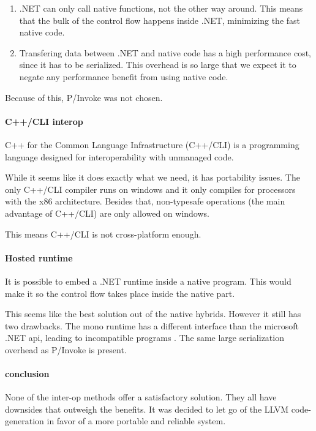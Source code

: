 \begin{enumerate}
    \item .NET can only call native functions, not the other way around.
        This means that the bulk of the control flow happens inside .NET, minimizing the fast native code.
    \item Transfering data between .NET and native code has a high performance cost\cite{msdn_interop_performance}, since it has to be serialized.
        This overhead is so large that we expect it to negate any performance benefit from using native code.
\end{enumerate}

Because of this, P/Invoke was not chosen.

\paragraph{C++/CLI interop}
C++ for the Common Language Infrastructure (C++/CLI) is a programming language designed for interoperability with unmanaged code.\cite{msdn_c++cli}

While it seems like it does exactly what we need, it has portability issues.
The only C++/CLI compiler runs on windows and it only compiles for processors with the x86 architecture\cite{mono_c++cli}.
Besides that, non-typesafe operations (the main advantage of C++/CLI) are only allowed on windows.\cite{mono_c++cli}

This means C++/CLI is not cross-platform enough.

\paragraph{Hosted runtime}
It is possible to embed a .NET runtime inside a native program.
This would make it so the control flow takes place inside the native part.

This seems like the best solution out of the native hybrids.
However it still has two drawbacks.
The mono runtime has a different interface than the microsoft .NET api, leading to incompatible programs \cite{mono_embedding}.
The same large serialization overhead as P/Invoke is present\cite{msdn_hosted}.

\paragraph{conclusion}
None of the inter-op methods offer a satisfactory solution.
They all have downsides that outweigh the benefits.
It was decided to let go of the LLVM code-generation in favor of a more portable and reliable system.

